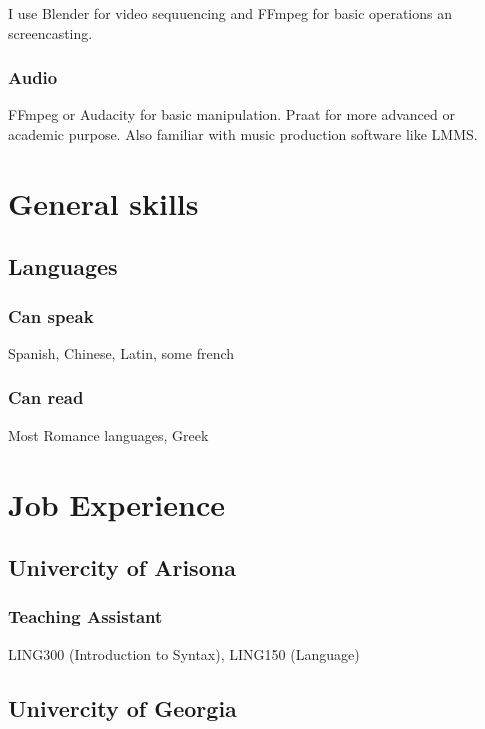 \documentclass{article}
\begin{document}
I use Blender for video sequuencing and FFmpeg for basic operations an screencasting.

\subsubsection{Audio}

FFmpeg or Audacity for basic manipulation. Praat for more advanced or academic purpose. Also familiar with music production software like LMMS.

\section{General skills}

\subsection{Languages}

\subsubsection{Can speak}

Spanish, Chinese, Latin, some french

\subsubsection{Can read} 

Most Romance languages, Greek

\section{Job Experience}

\subsection{Univercity of Arisona}

\subsubsection{Teaching Assistant}

LING300 (Introduction to Syntax), LING150 (Language)

\subsection{Univercity of Georgia}
\end{document}
